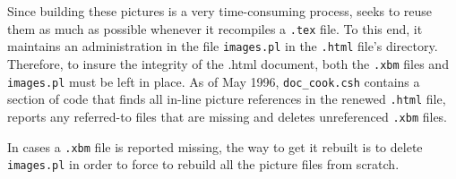         Since building these pictures is a very time-consuming process, \ltoh
seeks to reuse them as much as possible whenever it recompiles a \verb/.tex/
file. To this end, it maintains an administration in the file \verb/images.pl/
in the \verb/.html/ file's directory. Therefore, to insure the integrity of the
.html document, both the \verb/.xbm/ files and \verb/images.pl/ must be left in
place. As of May 1996, \verb/doc_cook.csh/ contains a section of code that
finds all in-line picture references in the renewed \verb/.html/ file, reports
any referred-to files that are missing and deletes unreferenced \verb/.xbm/
files.

        In cases a \verb/.xbm/ file is reported missing, the way to get it
rebuilt is to delete \verb/images.pl/ in order to force \ltoh to rebuild all
the picture files from scratch.  



